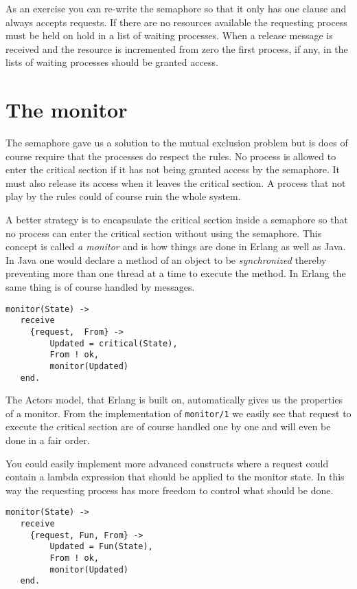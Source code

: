 \documentclass[a4paper,11pt]{article}
\begin{document}
As an exercise you can re-write the semaphore so that it only has one
clause and always accepts requests. If there are no resources
available the requesting process must be held on hold in a list of
waiting processes. When a release message is received and the resource
is incremented from zero the first process, if any, in the lists of
waiting processes should be granted access. 

\section{The monitor}

The semaphore gave us a solution to the mutual exclusion problem but
is does of course require that the processes do respect the rules. No
process is allowed to enter the critical section if it has not being
granted access by the semaphore. It must also release its access when
it leaves the critical section. A process that not play by the rules
could of course ruin the whole system.

A better strategy is to encapsulate the critical section inside a
semaphore so that no process can enter the critical section without
using the semaphore. This concept is called {\em a monitor} and is how
things are done in Erlang as well as Java. In Java one would declare a
method of an object to be {\em synchronized} thereby preventing more
than one thread at a time to execute the method. In Erlang the same
thing is of course handled by messages. 

\begin{verbatim}
monitor(State) ->
   receive 
     {request,  From} ->
         Updated = critical(State), 
         From ! ok,
         monitor(Updated)
   end.
\end{verbatim}

The Actors model, that Erlang is built on, automatically gives us the
properties of a monitor. From the implementation of {\tt monitor/1}
we easily see that request to execute the critical section are of
course handled one by one and will even be done in a fair order.

You could easily implement more advanced constructs where a request
could contain a lambda expression that should be applied to the
monitor state. In this way the requesting process has more freedom to
control what should be done.

\begin{verbatim}
monitor(State) ->
   receive 
     {request, Fun, From} ->
         Updated = Fun(State), 
         From ! ok,
         monitor(Updated)
   end.
\end{verbatim}
\end{document}
